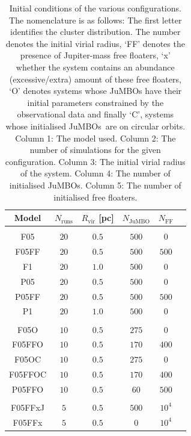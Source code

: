 \documentclass[submission,phys]{lib/SciPost}
\newcommand{\jumbo}{\mbox{JuMBO}}
\newcommand{\jumbos}{\mbox{JuMBOs}}
\begin{document}
\begin{table}
  \caption{Initial conditions of the various configurations. The
    nomenclature is as follows: The first letter identifies the
    cluster distribution. The number denotes the initial virial
    radius, `FF' denotes the presence of Jupiter-mass free floaters,
    `x' whether the system contains an abundance (excessive/extra)
    amount of these free floaters, `O' denotes systems whose \jumbos
    have their initial parameters constrained by the observational
    data and finally `C', systems whose initialised \jumbos\, are on
    circular orbits. Column 1: The model used. Column 2: The number of
    simulations for the given configuration. Column 3: The initial
    virial radius of the system. Column 4: The number of initialised
    \jumbos. Column 5: The number of initialised free floaters.}
        \label{Tab:SF_FF_Params}
        \centering 
        \begin{tabular}{c c c c c c}
        \hline\hline
        Model & $N_{\mathrm{runs}}$ & $R_{\mathrm{vir}}$ [pc] & $N_{\mathrm{\jumbo}}$ & $N_{\mathrm{FF}}$\\
        \hline \vspace{-0.75em}\\ 
           F05     & $20$ & $0.5$ & $500$ & $0$ \\
           F05FF   & $20$ & $0.5$ & $500$ & $500$ \\
           F1      & $20$ & $1.0$ & $500$ & $0$ \\
           P05     & $20$ & $0.5$ & $500$ & $0$ \\
           P05FF   & $20$ & $0.5$ & $500$ & $500$ \\
           P1      & $20$ & $1.0$ & $500$ & $0$ \\
           \hline
           \hline \vspace{-0.75em}\\
           F05O   & $10$ & $0.5$ & $275$ & $0$ \\
           F05FFO & $10$ & $0.5$ & $170$ & $400$ & \\
           F05OC   & $10$ & $0.5$ & $275$ & $0$ \\
           F05FFOC & $10$ & $0.5$ & $170$ & $400$ & \\
           P05FFO   & $10$ & $0.5$ & $60$  & $500$ \\
           \hline
           \hline \vspace{-0.75em}\\
           F05FFxJ & $5$ & $0.5$ & $500$ & $10^{4}$ \\
           F05FFx  & $5$ & $0.5$ & $0$   & $10^{4}$\\
         \hline                                   %
        \end{tabular}
     \end{table}
\end{document}

